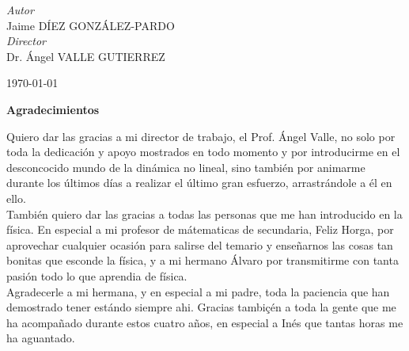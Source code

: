 \documentclass[a4paper, 11pt, oneside]{book}
\begin{document}
\begin{titlepage}
			
				\begin{flushright}
					\large
					\textit{Autor}\\
					Jaime \textsc{DÍEZ GONZÁLEZ-PARDO} \\ %
					\large
					\textit{Director}\\
					Dr. Ángel \textsc{VALLE GUTIERREZ} %
				\end{flushright}
			
			
				\vfill\vfill\vfill %
				
				{\large\today} %
				
			
				\vfill %
		
		\end{titlepage}

			\begin{center}
				\textbf{ \large Agradecimientos}
			\end{center}
					
				Quiero dar las gracias a mi director de trabajo, el Prof. \'Angel Valle, no solo por toda la dedicaci\'on y apoyo mostrados en todo momento y por introducirme en el desconcocido mundo de la din\'amica no lineal, sino tambi\'en por animarme durante los \'ultimos d\'ias a realizar el \'ultimo gran esfuerzo, arrastr\'andole a \'el en ello.  \\
					
				Tambi\'en quiero dar las gracias a todas las personas que me han introducido en la f\'isica. En especial a mi profesor de m\'atematicas de secundaria, Feliz Horga, por aprovechar cualquier ocasi\'on para salirse del temario y enseñarnos las cosas tan bonitas que esconde la física, y a mi hermano Álvaro por transmitirme con tanta pasión todo lo que aprendia de física. \\

				Agradecerle a mi hermana, y en especial a mi padre, toda la paciencia que han demostrado tener estándo siempre ahi. Gracias tambiçén a toda la gente que me ha acompañado durante estos cuatro años, en especial a Inés que tantas horas me ha aguantado. \\
\end{document}
